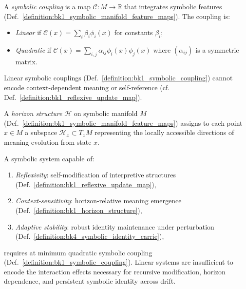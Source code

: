 \begin{definition}
\label{definition:bk1_symbolic_coupling}
A \emph{symbolic coupling} is a map $\mathcal{C}: M \to \mathbb{R}$ that integrates symbolic features (Def.~\ref{definition:bk1_symbolic_manifold_feature_maps}). The coupling is:
\begin{itemize}
  \item \emph{Linear} if $\mathcal{C}(x) = \sum_i \beta_i \phi_i(x)$ for constants $\beta_i$;
  \item \emph{Quadratic} if $\mathcal{C}(x) = \sum_{i,j} \alpha_{ij} \phi_i(x)\phi_j(x)$ where $(\alpha_{ij})$ is a symmetric matrix.
\end{itemize}
\end{definition}

\begin{lemma}
\label{lemma:bk1_linear_context_independence}
Linear symbolic couplings (Def.~\ref{definition:bk1_symbolic_coupling}) cannot encode context-dependent meaning or self-reference (cf. Def.~\ref{definition:bk1_reflexive_update_map}).
\end{lemma}

\begin{definition}
\label{definition:bk1_horizon_structure}
A \emph{horizon structure} $\mathcal{H}$ on symbolic manifold $M$ (Def.~\ref{definition:bk1_symbolic_manifold_feature_maps}) assigns to each point $x \in M$ a subspace $\mathcal{H}_x \subset T_x M$ representing the locally accessible directions of meaning evolution from state $x$.
\end{definition}

\begin{theorem}
\label{theorem:bk1_minimal_quadratic_sufficiency}
A symbolic system capable of:
\begin{enumerate}
  \item \emph{Reflexivity}: self-modification of interpretive structures (Def.~\ref{definition:bk1_reflexive_update_map}),
  \item \emph{Context-sensitivity}: horizon-relative meaning emergence (Def.~\ref{definition:bk1_horizon_structure}),
  \item \emph{Adaptive stability}: robust identity maintenance under perturbation (Def.~\ref{definition:bk4_symbolic_identity_carrie}),
\end{enumerate}
requires at minimum quadratic symbolic coupling (Def.~\ref{definition:bk1_symbolic_coupling}). Linear systems are insufficient to encode the interaction effects necessary for recursive modification, horizon dependence, and persistent symbolic identity across drift.
\end{theorem}

